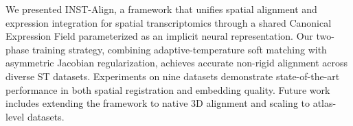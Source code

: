 \documentclass[runningheads]{llncs}
\begin{document}
We presented INST-Align, a framework that unifies spatial alignment and expression integration for spatial transcriptomics through a shared Canonical Expression Field parameterized as an implicit neural representation. Our two-phase training strategy, combining adaptive-temperature soft matching with asymmetric Jacobian regularization, achieves accurate non-rigid alignment across diverse ST datasets. Experiments on nine datasets demonstrate state-of-the-art performance in both spatial registration and embedding quality. Future work includes extending the framework to native 3D alignment and scaling to atlas-level datasets.



\end{document}
